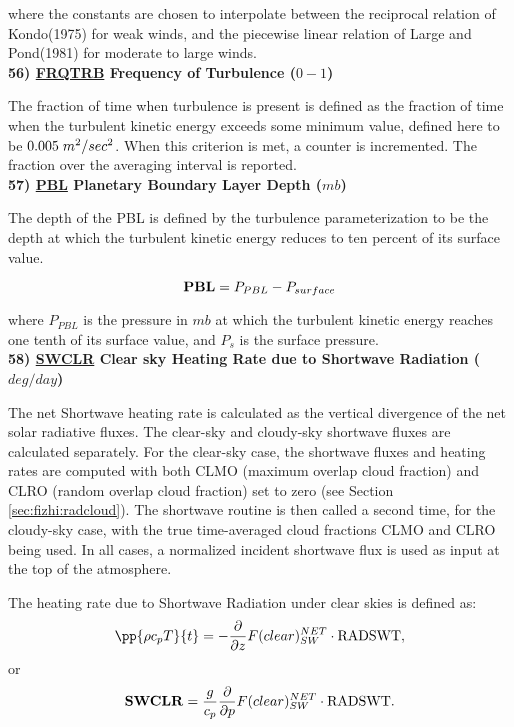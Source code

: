 \noindent
where the constants are chosen to interpolate between the reciprocal relation of
Kondo(1975) for weak winds, and the piecewise linear relation of Large and Pond(1981) 
for moderate to large winds.
\\
 
\noindent
{\bf 56)  \underline {FRQTRB}  Frequency of Turbulence ($0-1$) }

\noindent
The fraction of time when turbulence is present is defined as the fraction of
time when the turbulent kinetic energy exceeds some minimum value, defined here
to be $0.005 \hspace{.1cm}m^2/sec^2$. When this criterion is met, a counter is
incremented. The fraction over the averaging interval is reported.
\\
 
\noindent
{\bf 57)  \underline {PBL}  Planetary Boundary Layer Depth ($mb$) }

\noindent
The depth of the PBL is defined by the turbulence parameterization to be the
depth at which the turbulent kinetic energy reduces to ten percent of its surface
value.

\[
{\bf PBL} = P_{PBL} - P_{surface}
\]

\noindent
where $P_{PBL}$ is the pressure in $mb$ at which the turbulent kinetic energy
reaches one tenth of its surface value, and $P_s$ is the surface pressure.
\\
 
\noindent
{\bf 58)  \underline {SWCLR} Clear sky Heating Rate due to Shortwave Radiation ($deg/day$) }

\noindent
The net Shortwave heating rate is calculated as the vertical divergence of the
net solar radiative fluxes.
The clear-sky and cloudy-sky shortwave fluxes are calculated separately.
For the clear-sky case, the shortwave fluxes and heating rates are computed with
both CLMO (maximum overlap cloud fraction) and
CLRO (random overlap cloud fraction) set to zero (see Section \ref{sec:fizhi:radcloud}).
The shortwave routine is then called a second time, for the cloudy-sky case, with the
true time-averaged cloud fractions CLMO
and CLRO being used.  In all cases, a normalized incident shortwave flux is used as
input at the top of the atmosphere.

\noindent
The heating rate due to Shortwave Radiation under clear skies is defined as:
\[
\pp{\rho c_p T}{t} = - {\partial \over \partial z} F(clear)_{SW}^{NET} \cdot {\rm RADSWT},
\]
or
\[
{\bf SWCLR} = \frac{g}{c_p } {\partial \over \partial p} F(clear)_{SW}^{NET}\cdot {\rm RADSWT} .
\]

